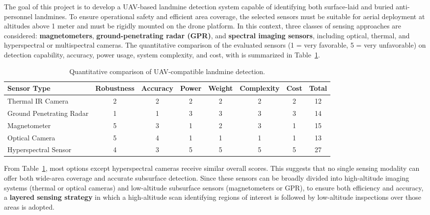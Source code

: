The goal of this project is to develop a UAV-based landmine detection system capable of identifying both surface-laid and buried anti-personnel landmines. To ensure operational safety and efficient area coverage, the selected sensors must be suitable for aerial deployment at altitudes above 1 meter and must be rigidly mounted on the drone platform. In this context, three classes of sensing approaches are considered: \textbf{magnetometers}, \textbf{ground-penetrating radar (GPR)}, and \textbf{spectral imaging sensors}, including optical, thermal, and hyperspectral or multispectral cameras. The quantitative comparison of the evaluated sensors (1 = very favorable, 5 = very unfavorable) on detection capability, accuracy, power usage, system complexity, and cost, with is summarized in Table~\ref{tab:sensor_comparison}.


\begin{table}[h]
    \centering
    \small
    \renewcommand{\arraystretch}{1.3}
    \caption{Quantitative comparison of UAV-compatible landmine detection.}
    \label{tab:sensor_comparison}
    \begin{tabular}{l c c c c c c c}
        \toprule
        \textbf{Sensor Type} & \textbf{Robustness} & \textbf{Accuracy} & \textbf{Power} & \textbf{Weight} & \textbf{Complexity} & \textbf{Cost} & \textbf{Total} \\
        \midrule
        Thermal IR Camera        & 2 & 2 & 2 & 2 & 2 & 2 & 12 \\
        Ground Penetrating Radar & 1 & 1 & 3 & 3 & 3 & 3 & 14 \\
        Magnetometer             & 5 & 3 & 1 & 2 & 3 & 1 & 15 \\
        Optical Camera           & 5 & 4 & 1 & 1 & 1 & 1 & 13 \\
        Hyperspectral Sensor     & 4 & 3 & 5 & 5 & 5 & 5 & 27 \\
        \bottomrule
    \end{tabular}
\end{table}

From Table~\ref{tab:sensor_comparison}, most options except hyperspectral cameras receive similar overall scores. This suggests that no single sensing modality can offer both wide-area coverage and accurate subsurface detection. Since these sensors can be broadly divided into high-altitude imaging systems (thermal or optical cameras) and low-altitude subsurface sensors (magnetometers or GPR), to ensure both efficiency and accuracy, a \textbf{layered sensing strategy} in which a high-altitude scan identifying regions of interest is followed by low-altitude inspections over those areas is adopted.

